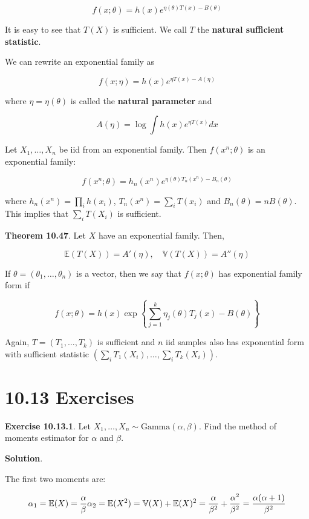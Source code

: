 \[f(x; \theta) = h(x) e^{\eta(\theta)T(x) - B(\theta)}\]

It is easy to see that \(T(X)\) is sufficient. We call \(T\) the
\textbf{natural sufficient statistic}.

We can rewrite an exponential family as

\[f(x; \eta) = h(x) e^{\eta T(x) - A(\eta)}\]

where \(\eta = \eta(\theta)\) is called the \textbf{natural parameter}
and

\[A(\eta) = \log \int h(x) e^{\eta T(x)} dx\]

Let \(X_1, \dots, X_n\) be iid from an exponential family. Then
\(f(x^n; \theta)\) is an exponential family:

\[f(x^n; \theta) = h_n(x^n) e^{\eta(\theta) T_n(x^n) - B_n(\theta)}\]

where \(h_n(x^n) = \prod_i h(x_i)\), \(T_n(x^n) = \sum_i T(x_i)\) and
\(B_n(\theta) = nB(\theta)\). This implies that \(\sum_i T(X_i)\) is
sufficient.

\textbf{Theorem 10.47}. Let \(X\) have an exponential family. Then,

\[
\mathbb{E}(T(X)) = A'(\eta),
\quad
\mathbb{V}(T(X)) = A''(\eta)
\]

If \(\theta = (\theta_1, \dots, \theta_n)\) is a vector, then we say
that \(f(x; \theta)\) has exponential family form if

\[ f(x; \theta) = h(x) \exp \left\{ \sum_{j=1}^k \eta_j(\theta) T_j(x) - B(\theta) \right\}\]

Again, \(T = (T_1, \dots, T_k)\) is sufficient and \(n\) iid samples
also has exponential form with sufficient statistic
\(\left(\sum_i T_1(X_i), \dots, \sum_i T_k(X_i)\right)\).

\section{10.13 Exercises}\label{exercises}

\textbf{Exercise 10.13.1}. Let
\(X_1, \dots, X_n \sim \text{Gamma}(\alpha, \beta)\). Find the method of
moments estimator for \(\alpha\) and \(\beta\).

\textbf{Solution}.

The first two moments are:

\[
\alpha_1 = \mathbb{E}(X) = \frac{\alpha}{\beta}\\
\alpha_2 = \mathbb{E}(X^2) = \mathbb{V}(X) + \mathbb{E}(X)^2 = \frac{\alpha}{\beta^2} + \frac{\alpha^2}{\beta^2} = \frac{\alpha(\alpha + 1)}{\beta^2} 
\]


